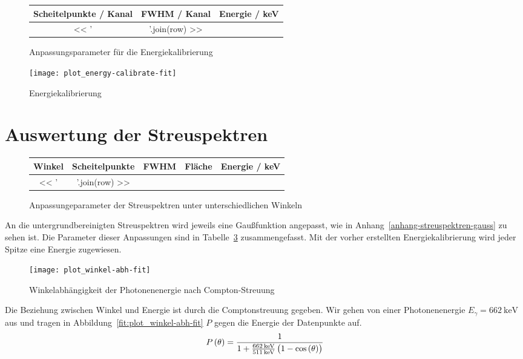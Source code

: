 \documentclass[11pt, ngerman, fleqn, DIV=15, headinclude, BCOR=2cm]{scrreprt}
\newcommand{\plotwidth}{0.8\linewidth}
\begin{document}
\begin{figure}
	\centering
	\begin{tabular}{SSS}
		{Scheitelpunkte / Kanal} &
		{FWHM / Kanal} &
		{Energie / \si{\kilo\electronvolt}}\\
		\midrule
		<< ' & '.join(row) >> \\
	\end{tabular}
	\caption{%
		Anpassungsparameter für die Energiekalibrierung
	}
	\label{tab:energiekalibrierung}
\end{figure}

\begin{figure}
    \centering
    \texttt{[image: plot\_energy-calibrate-fit]}
    \caption{%
	    Energiekalibrierung
    }
    \label{fig:plot_energy-calibrate-fit}
\end{figure}


\section{Auswertung der Streuspektren}
\begin{figure}
	\centering
	\begin{tabular}{SSSSS}
		{Winkel} &
		{Scheitelpunkte} &
		{FWHM} &
		{Fläche}&
		{Energie / \si{\kilo\electronvolt}}\\
		\midrule
		<< ' & '.join(row) >> \\
	\end{tabular}
	\caption{%
		Anpassungeparameter der Streuspektren unter unterschiedlichen
		Winkeln
	}
	\label{tab:peakanpassung}
\end{figure}

An die untergrundbereinigten Streuspektren wird jeweils eine Gaußfunktion
angepasst, wie in Anhang~\ref{anhang-streuspektren-gauss} zu sehen ist.
Die Parameter dieser Anpassungen sind in Tabelle~\ref{tab:peakanpassung}
zusammengefasst. Mit der vorher erstellten Energiekalibrierung wird jeder
Spitze eine Energie zugewiesen.

\begin{figure}
    \centering
    \texttt{[image: plot\_winkel-abh-fit]}
    \caption{%
	    Winkelabhängigkeit der Photonenenergie nach Compton-Streuung
    }
    \label{fig:plot_winkel-abh-fit}
\end{figure}

Die Beziehung zwischen Winkel und Energie ist durch die Comptonstreuung
gegeben. Wir gehen von einer Photonenenergie $E_\gamma =
\SI{662}{\kilo\electronvolt}$ aus und tragen in
Abbildung~\ref{fit:plot_winkel-abh-fit} $P$ gegen die Energie der Datenpunkte
auf.
\begin{equation}
	P\del \theta = \frac1{1 +
		\frac{\SI{662}{\kilo\electronvolt}}{\SI{511}{\kilo\electronvolt}}
		\del{1 - \cos\del\theta}}
\end{equation}
\end{document}
